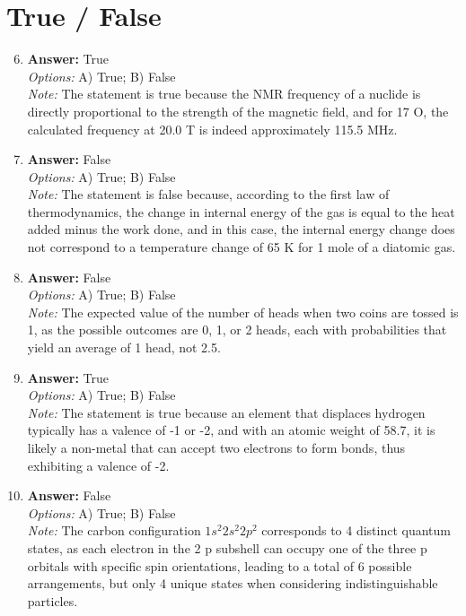 \documentclass[12pt]{article}
\begin{document}
\section*{True / False}
\begin{enumerate}[label=\arabic*.]
\setcounter{enumi}{5}
\item \textbf{Answer:} True
\\ \textit{Options:} A) True; B) False
\\ \textit{Note:} The statement is true because the NMR frequency of a nuclide is directly proportional to the strength of the magnetic field, and for 17 O, the calculated frequency at 20.0 T is indeed approximately 115.5 MHz.
\item \textbf{Answer:} False
\\ \textit{Options:} A) True; B) False
\\ \textit{Note:} The statement is false because, according to the first law of thermodynamics, the change in internal energy of the gas is equal to the heat added minus the work done, and in this case, the internal energy change does not correspond to a temperature change of 65 K for 1 mole of a diatomic gas.
\item \textbf{Answer:} False
\\ \textit{Options:} A) True; B) False
\\ \textit{Note:} The expected value of the number of heads when two coins are tossed is 1, as the possible outcomes are 0, 1, or 2 heads, each with probabilities that yield an average of 1 head, not 2.5.
\item \textbf{Answer:} True
\\ \textit{Options:} A) True; B) False
\\ \textit{Note:} The statement is true because an element that displaces hydrogen typically has a valence of -1 or -2, and with an atomic weight of 58.7, it is likely a non-metal that can accept two electrons to form bonds, thus exhibiting a valence of -2.
\item \textbf{Answer:} False
\\ \textit{Options:} A) True; B) False
\\ \textit{Note:} The carbon configuration $1 s^2 2 s^2 2 p^2$ corresponds to 4 distinct quantum states, as each electron in the 2 p subshell can occupy one of the three p orbitals with specific spin orientations, leading to a total of 6 possible arrangements, but only 4 unique states when considering indistinguishable particles.
\end{enumerate}
\end{document}
